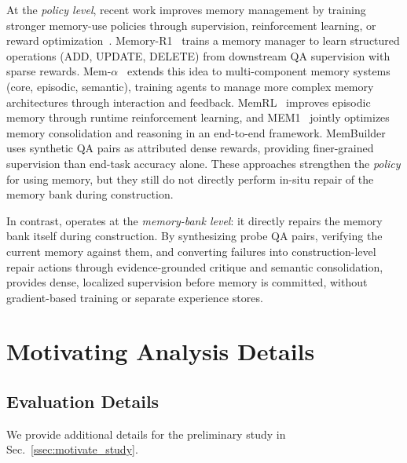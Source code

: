 At the \emph{policy level}, recent work improves memory management by training stronger memory-use policies through supervision, reinforcement learning, or reward optimization~\cite{guo2025deepseek,yan2025memory,lin2025comprehensive,lin2026how}.
Memory-R1~\cite{yan2025memory} trains a memory manager to learn structured operations (ADD, UPDATE, DELETE) from downstream QA supervision with sparse rewards.
Mem-$\alpha$~\cite{wang2025memalpha} extends this idea to multi-component memory systems (core, episodic, semantic), training agents to manage more complex memory architectures through interaction and feedback.
MemRL~\cite{zhang2026memrl} improves episodic memory through runtime reinforcement learning, and MEM1~\cite{zhou2025mem1} jointly optimizes memory consolidation and reasoning in an end-to-end framework.
MemBuilder~\cite{shen2026membuilder} uses synthetic QA pairs as attributed dense rewards, providing finer-grained supervision than end-task accuracy alone.
These approaches strengthen the \emph{policy} for using memory, but they still do not directly perform in-situ repair of the memory bank during construction.

In contrast, \method operates at the \emph{memory-bank level}: it directly repairs the memory bank itself during construction.
By synthesizing probe QA pairs, verifying the current memory against them, and converting failures into construction-level repair actions through evidence-grounded critique and semantic consolidation, \method provides dense, localized supervision before memory is committed, without gradient-based training or separate experience stores.

\section{Motivating Analysis Details}
\subsection{Evaluation Details}
\label{appendix:preliminary_evaluation_details}
We provide additional details for the preliminary study in Sec.~\ref{ssec:motivate_study}.

